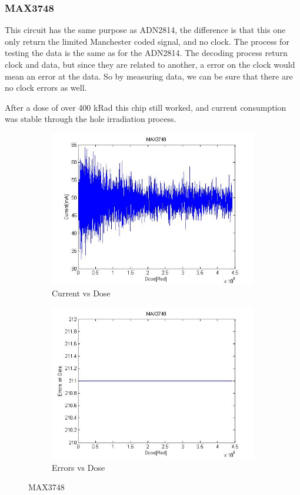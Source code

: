 \documentclass[12pt]{article}
\numberwithin{figure}{section}
\begin{document}
\subsubsection{MAX3748}
This circuit has the same purpose as ADN2814, the difference is that this one only return the limited Manchester coded signal, and no clock. The process for testing the data is the same as for the ADN2814.
The decoding process return clock and data, but since they are related to another, a error on the clock would mean an error at the data. So by measuring data, we can be sure that there are no clock errors as well. 

After a dose of over 400 kRad this chip still worked, and current consumption was stable through the hole irradiation process.

\begin{figure}[!htbp]
\centering
  \begin{subfigure}{.49\textwidth}
  \centering
  \includegraphics[width=\linewidth]{current_dose_MAX.jpg}
  \caption{Current vs Dose}
  \label{MAX3748}
  \end{subfigure}
  \begin{subfigure}{.49\textwidth}
  \centering
  \includegraphics[width=\linewidth]{error_dose_MAX.jpg}
  \caption{Errors vs Dose}
  \label{MAX3748_error}
  \end{subfigure}
 \caption{MAX3748}
\end{figure}
\end{document}
